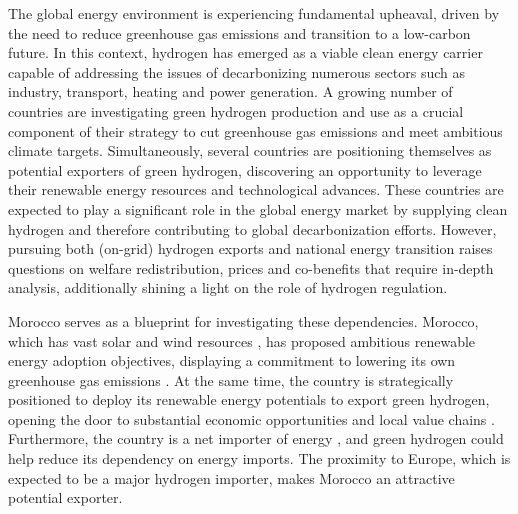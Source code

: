 






The global energy environment is experiencing fundamental upheaval, driven by the need to reduce greenhouse gas emissions and transition to a low-carbon future. In this context, hydrogen has emerged as a viable clean energy carrier capable of addressing the issues of decarbonizing numerous sectors such as industry, transport, heating and power generation. A growing number of countries are investigating green hydrogen production and use as a crucial component of their strategy to cut greenhouse gas emissions and meet ambitious climate targets.
Simultaneously, several countries are positioning themselves as potential exporters of green hydrogen, discovering an opportunity to leverage their renewable energy resources and technological advances. %
These countries are expected to play a significant role in the global energy market by supplying clean hydrogen and therefore contributing to global decarbonization efforts. However, pursuing both (on-grid) hydrogen exports and national energy transition raises questions on welfare redistribution, prices and co-benefits that require in-depth analysis, additionally shining a light on the role of hydrogen regulation.

Morocco serves as a blueprint for investigating these dependencies. Morocco, which has vast solar and wind resources \cite{Peters2023, Touili2018, Sterl2022}, has proposed ambitious renewable energy adoption objectives, displaying a commitment to lowering its own greenhouse gas emissions \cite{CAT2021}. At the same time, the country is strategically positioned to deploy its renewable energy potentials to export green hydrogen, opening the door to substantial economic opportunities and local value chains \cite{Ersoy2022}. Furthermore, the country is a net importer of energy \cite{IEA2022}, and green hydrogen could help reduce its dependency on energy imports. The proximity to Europe, which is expected to be a major hydrogen importer, makes Morocco an attractive potential exporter. %


